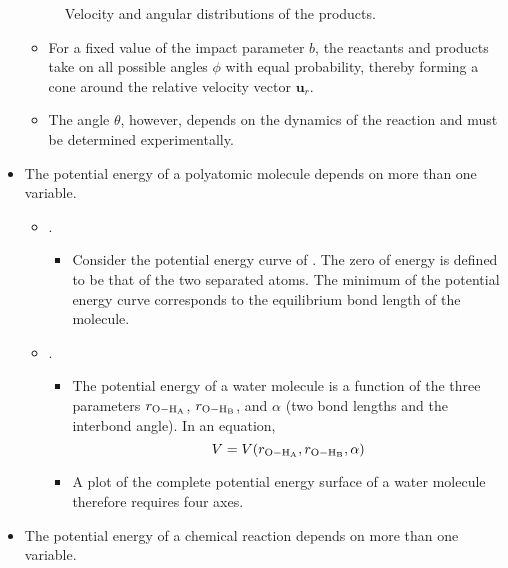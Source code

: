 \documentclass[../notes.tex]{subfiles}
\begin{document}
\begin{itemize}
\begin{figure}[h!]
        \caption{Velocity and angular distributions of the products.}
        \label{fig:velocityAngleDist}
    \end{figure}
    \begin{itemize}
        \item For a fixed value of the impact parameter $b$, the reactants and products take on all possible angles $\phi$ with equal probability, thereby forming a cone around the relative velocity vector $\mathbf{u}_r$.
        \item The angle $\theta$, however, depends on the dynamics of the reaction and must be determined experimentally.
    \end{itemize}
    \item The potential energy of a polyatomic molecule depends on more than one variable.
    \begin{itemize}
        \item {}.
        \begin{itemize}
            \item Consider the potential energy curve of . The zero of energy is defined to be that of the two separated atoms. The minimum of the potential energy curve corresponds to the equilibrium bond length of the  molecule.
        \end{itemize}
        \item {}.
        \begin{itemize}
            \item The potential energy of a water molecule is a function of the three parameters $r_{\ce{O-H_A}}$, $r_{\ce{O-H_B}}$, and $\alpha$ (two bond lengths and the interbond angle). In an equation,
            \begin{equation*}
                V = V(r_{\ce{O-H_A}},r_{\ce{O-H_B}},\alpha)
            \end{equation*}
            \item A plot of the complete potential energy surface of a water molecule therefore requires four axes.
        \end{itemize}
    \end{itemize}
    \item The potential energy of a chemical reaction depends on more than one variable.
    \begin{figure}[H]
        \centering
\end{figure}
\end{itemize}
\end{document}
